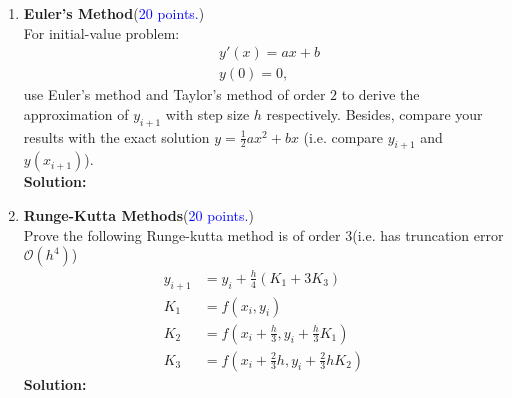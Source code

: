 \documentclass[11pt]{article}
\begin{document}
\newpage
\begin{enumerate}
  \item \textbf{Euler's Method}(\textcolor{blue}{20 points.})\\ 
  For initial-value problem:
  \begin{equation}
  \begin{aligned}
      &y'(x)=ax+b\\
      &y(0) = 0,
  \end{aligned}
 \end{equation}
 use Euler's method and Taylor's method of order $2$ to derive the approximation of $y_{i+1}$ with step size $h$ respectively. Besides, compare your results with the exact solution $y=\frac{1}{2}ax^2+bx$ (i.e. compare $y_{i+1}$ and $y(x_{i+1})$). \\
\textbf{Solution:}\\

    
\newpage
\item \textbf{Runge-Kutta Methods}(\textcolor{blue}{20 points.})\\
Prove the following Runge-kutta method is of order 3(i.e. has truncation error $\mathcal{O}(h^4)$)
\begin{equation}
    \begin{aligned}
        y_{i+1} &= y_i+\frac{h}{4}(K_1+3K_3)\\
        K_1 &= f(x_i,y_i)\\
        K_2 &= f(x_i+\frac{h}{3},y_i+\frac{h}{3}K_1)\\
        K_3 &= f(x_i+\frac{2}{3}h,y_i+\frac{2}{3}hK_2)
    \end{aligned}
\end{equation}
\newline \textbf{Solution:}\\

\newpage



\end{enumerate}
\end{document}
